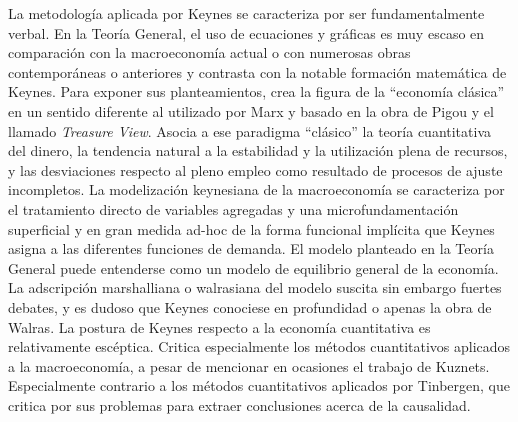 \documentclass{nuevotema}
\begin{document}
La metodología aplicada por Keynes se caracteriza por ser fundamentalmente verbal. En la Teoría General, el uso de ecuaciones y gráficas es muy escaso en comparación con la macroeconomía actual o con numerosas obras contemporáneas o anteriores y contrasta con la notable formación matemática de Keynes. Para exponer sus planteamientos, crea la figura de la ``economía clásica'' en un sentido diferente al utilizado por Marx y basado en la obra de Pigou y el llamado \textit{Treasure View}. Asocia a ese paradigma ``clásico'' la teoría cuantitativa del dinero, la tendencia natural a la estabilidad y la utilización plena de recursos, y las desviaciones respecto al pleno empleo como resultado de procesos de ajuste incompletos. La modelización keynesiana de la macroeconomía se caracteriza por el tratamiento directo de variables agregadas y una microfundamentación superficial y en gran medida ad-hoc de la forma funcional implícita que Keynes asigna a las diferentes funciones de demanda. El modelo planteado en la Teoría General puede entenderse como un modelo de equilibrio general de la economía. La adscripción marshalliana o walrasiana del modelo suscita sin embargo fuertes debates, y es dudoso que Keynes conociese en profundidad o apenas la obra de Walras. La postura de Keynes respecto a la economía cuantitativa es relativamente escéptica. Critica especialmente los métodos cuantitativos aplicados a la macroeconomía, a pesar de mencionar en ocasiones el trabajo de Kuznets. Especialmente contrario a los métodos cuantitativos aplicados por Tinbergen, que critica por sus problemas para extraer conclusiones acerca de la causalidad.
\end{document}
